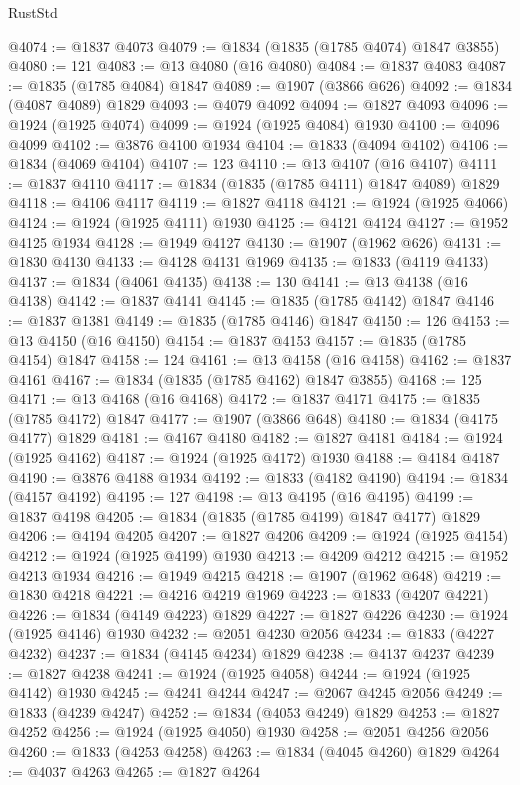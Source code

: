 \begin{lexlean}{RustStd}
\begin{coremodule}
{\begin{coremodule}
{{{{{@4074 := @1837 @4073
@4079 := @1834 (@1835 (@1785 @4074) @1847 @3855)
@4080 := 121
@4083 := @13 @4080 (@16 @4080)
@4084 := @1837 @4083
@4087 := @1835 (@1785 @4084) @1847
@4089 := @1907 (@3866 @626)
@4092 := @1834 (@4087 @4089) @1829
@4093 := @4079 @4092
@4094 := @1827 @4093
@4096 := @1924 (@1925 @4074)
@4099 := @1924 (@1925 @4084) @1930
@4100 := @4096 @4099
@4102 := @3876 @4100 @1934
@4104 := @1833 (@4094 @4102)
@4106 := @1834 (@4069 @4104)
@4107 := 123
@4110 := @13 @4107 (@16 @4107)
@4111 := @1837 @4110
@4117 := @1834 (@1835 (@1785 @4111) @1847 @4089) @1829
@4118 := @4106 @4117
@4119 := @1827 @4118
@4121 := @1924 (@1925 @4066)
@4124 := @1924 (@1925 @4111) @1930
@4125 := @4121 @4124
@4127 := @1952 @4125 @1934
@4128 := @1949 @4127
@4130 := @1907 (@1962 @626)
@4131 := @1830 @4130
@4133 := @4128 @4131 @1969
@4135 := @1833 (@4119 @4133)
@4137 := @1834 (@4061 @4135)
@4138 := 130
@4141 := @13 @4138 (@16 @4138)
@4142 := @1837 @4141
@4145 := @1835 (@1785 @4142) @1847
@4146 := @1837 @1381
@4149 := @1835 (@1785 @4146) @1847
@4150 := 126
@4153 := @13 @4150 (@16 @4150)
@4154 := @1837 @4153
@4157 := @1835 (@1785 @4154) @1847
@4158 := 124
@4161 := @13 @4158 (@16 @4158)
@4162 := @1837 @4161
@4167 := @1834 (@1835 (@1785 @4162) @1847 @3855)
@4168 := 125
@4171 := @13 @4168 (@16 @4168)
@4172 := @1837 @4171
@4175 := @1835 (@1785 @4172) @1847
@4177 := @1907 (@3866 @648)
@4180 := @1834 (@4175 @4177) @1829
@4181 := @4167 @4180
@4182 := @1827 @4181
@4184 := @1924 (@1925 @4162)
@4187 := @1924 (@1925 @4172) @1930
@4188 := @4184 @4187
@4190 := @3876 @4188 @1934
@4192 := @1833 (@4182 @4190)
@4194 := @1834 (@4157 @4192)
@4195 := 127
@4198 := @13 @4195 (@16 @4195)
@4199 := @1837 @4198
@4205 := @1834 (@1835 (@1785 @4199) @1847 @4177) @1829
@4206 := @4194 @4205
@4207 := @1827 @4206
@4209 := @1924 (@1925 @4154)
@4212 := @1924 (@1925 @4199) @1930
@4213 := @4209 @4212
@4215 := @1952 @4213 @1934
@4216 := @1949 @4215
@4218 := @1907 (@1962 @648)
@4219 := @1830 @4218
@4221 := @4216 @4219 @1969
@4223 := @1833 (@4207 @4221)
@4226 := @1834 (@4149 @4223) @1829
@4227 := @1827 @4226
@4230 := @1924 (@1925 @4146) @1930
@4232 := @2051 @4230 @2056
@4234 := @1833 (@4227 @4232)
@4237 := @1834 (@4145 @4234) @1829
@4238 := @4137 @4237
@4239 := @1827 @4238
@4241 := @1924 (@1925 @4058)
@4244 := @1924 (@1925 @4142) @1930
@4245 := @4241 @4244
@4247 := @2067 @4245 @2056
@4249 := @1833 (@4239 @4247)
@4252 := @1834 (@4053 @4249) @1829
@4253 := @1827 @4252
@4256 := @1924 (@1925 @4050) @1930
@4258 := @2051 @4256 @2056
@4260 := @1833 (@4253 @4258)
@4263 := @1834 (@4045 @4260) @1829
@4264 := @4037 @4263
@4265 := @1827 @4264
}}}}}
\end{coremodule}}
\end{coremodule}
\end{lexlean}

